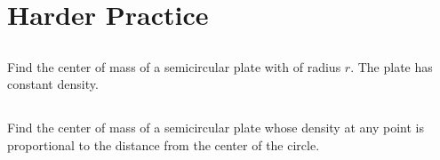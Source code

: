 \documentclass[11pt,letterpaper]{article}
\newif\ifshowsolutions
\newcommand{\sol}[1]{%
\ifshowsolutions
\par\vspace{0.3em}{\color{red}#1}\par
\fi
}
\begin{document}
\vfill

\pagebreak
\section{Harder Practice}

    \subsection{} Find the center of mass of a semicircular plate with of radius $r$. The plate has constant density. %
    
\sol{%
\textbf{Solution.}
Take the upper half-disk $x^2+y^2\leq r^2$, $y\geq 0$, with constant density $\rho$. By symmetry, $\overline{x}=0$.\\[0.4em]
Mass: $m=\rho\cdot\dfrac{\pi r^2}{2}$.\\
In polar coordinates,
\begin{align*}
M_x &= \iint_D y\rho\,dA
= \rho\int_0^{\pi}\int_0^{r}(s\sin\theta)\,s\,ds\,d\theta
= \rho\int_0^{\pi}\sin\theta\,d\theta\int_0^{r} s^2\,ds
= \rho\cdot 2\cdot\frac{r^3}{3}
= \frac{2\rho r^3}{3}.
\end{align*}
\begin{align*}
\overline{y} &= \frac{M_x}{m}
= \frac{2\rho r^3/3}{\rho\pi r^2/2}
= \frac{2r^3}{3}\cdot\frac{2}{\pi r^2}
= \frac{4r}{3\pi}.
\end{align*}
Center of mass: $\displaystyle\Bigl(0,\dfrac{4r}{3\pi}\Bigr)$.
}

\vfill

    \subsection{} Find the center of mass of a semicircular plate whose density at any point is proportional to the distance from the center of the circle. 

\sol{%
\textbf{Solution.}
Again take the upper half-disk of radius $r$. Density $\rho(x,y)=k\sqrt{x^2+y^2}=ks$ in polar. By symmetry, $\overline{x}=0$.
\begin{align*}
m &= \int_0^{\pi}\int_0^{r}(ks)\,s\,ds\,d\theta
= k\int_0^{\pi}d\theta\int_0^{r} s^2\,ds
= k\pi\cdot\frac{r^3}{3}
= \frac{k\pi r^3}{3}.
\end{align*}
\begin{align*}
M_x &= \iint_D y\rho\,dA
= \int_0^{\pi}\int_0^{r}(s\sin\theta)(ks)\,s\,ds\,d\theta
= k\int_0^{\pi}\sin\theta\,d\theta\int_0^{r} s^3\,ds
= k\cdot 2\cdot\frac{r^4}{4}
= \frac{k r^4}{2}.
\end{align*}
\begin{align*}
\overline{y} &= \frac{M_x}{m}
= \frac{kr^4/2}{k\pi r^3/3}
= \frac{r^4}{2}\cdot\frac{3}{\pi r^3}
= \frac{3r}{2\pi}.
\end{align*}
Center of mass: $\displaystyle\Bigl(0,\dfrac{3r}{2\pi}\Bigr)$.
}


\vfill


\vspace{8mm}
\end{document}

